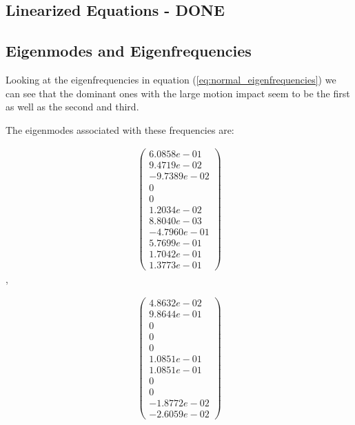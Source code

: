 \subsection{Linearized Equations - DONE}
\subsection{Eigenmodes and Eigenfrequencies}

Looking at the eigenfrequencies in equation (\ref{eq:normal_eigenfrequencies}) we can see that the dominant ones with the large motion impact seem to be the first as well as the second and third.

The eigenmodes associated with these frequencies are:

\begin{equation}
    \begin{split}
        \begin{pmatrix}
            6.0858e-01\\
            9.4719e-02\\
            -9.7389e-02\\
                        0\\
                        0\\
            1.2034e-02\\
            8.8040e-03\\
            -4.7960e-01\\
            5.7699e-01\\
            1.7042e-01\\
            1.3773e-01
        \end{pmatrix}
    \end{split}
\end{equation},

\begin{equation}
    \begin{split}
        \begin{pmatrix}
            4.8632e-02\\
            9.8644e-01\\
                    0\\
                    0\\
                    0\\
            1.0851e-01\\
            1.0851e-01\\
                    0\\
                    0\\
            -1.8772e-02\\
            -2.6059e-02
        \end{pmatrix}
    \end{split}
\end{equation}

